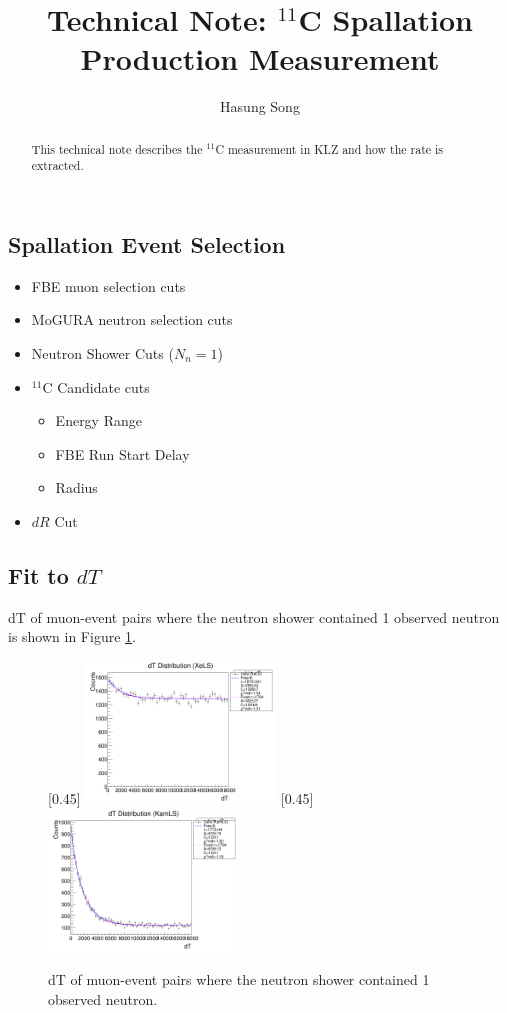 \documentclass[12pt,letterpaper]{article}
\begin{document}
\title{Technical Note: $^{11}$C Spallation Production Measurement}
\author{Hasung Song}
\maketitle
\begin{abstract}
	This technical note describes the $^{11}$C measurement in KLZ and how the rate is extracted.
\end{abstract}

\subsection*{Spallation Event Selection}
\begin{itemize}
	\item FBE muon selection cuts
	\item MoGURA neutron selection cuts
	\item Neutron Shower Cuts ($N_n=1$)
	\item $^{11}$C Candidate cuts
	\begin{itemize}
		\item Energy Range
		\item FBE Run Start Delay
		\item Radius
	\end{itemize}
	\item $dR$ Cut 
\end{itemize}

\subsection*{Fit to $dT$}
dT of muon-event pairs where the neutron shower contained 1 observed neutron is shown in Figure \ref{fig:dT_fits}.
\begin{figure}[h]
	\centering
	[0.45\textwidth]{
		\includegraphics[width=0.45\textwidth]{dT_distribution_allcuts_XeLS.png}}
	\hfill
	[0.45\textwidth]{
		\includegraphics[width=0.45\textwidth]{dT_distribution_allcuts_KamLS.png}}
	\caption{dT of muon-event pairs where the neutron shower contained 1 observed neutron.}
	\label{fig:dT_fits}
\end{figure}
\end{document}
